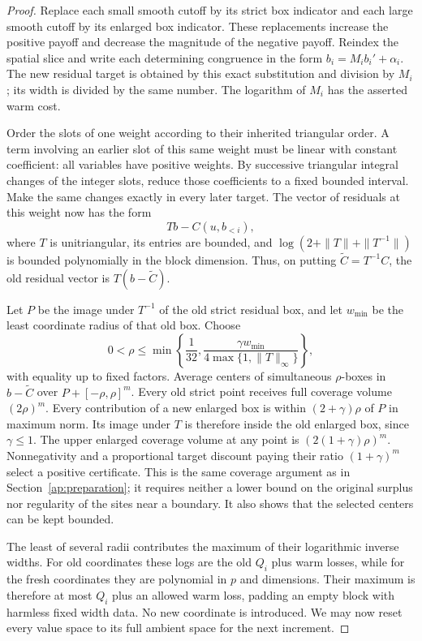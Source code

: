 \begin{proof}
Replace each small smooth cutoff by its strict box indicator and each large
smooth cutoff by its enlarged box indicator.  These replacements increase
the positive payoff and decrease the magnitude of the negative payoff.
Reindex the spatial slice and write each determining congruence in the form
$b_i=M_i b_i'+\alpha_i$.  The new residual target is obtained by this exact
substitution and division by $M_i$; its width is divided by the same number.
The logarithm of $M_i$ has the asserted warm cost.

Order the slots of one weight according to their inherited triangular order.
A term involving an earlier slot of this same weight must be linear with
constant coefficient: all variables have positive weights.  By successive
triangular integral changes of the integer slots, reduce those coefficients
to a fixed bounded interval.  Make the same changes exactly in every later
target.  The vector of residuals at this weight now has the form
\[
                    T b-C(u,b_{<i}),
\]
where $T$ is unitriangular, its entries are bounded, and
$\log(2+\|T\|+\|T^{-1}\|)$ is bounded polynomially in the block dimension.
Thus, on putting $\widetilde C=T^{-1}C$, the old residual vector is
$T(b-\widetilde C)$.

Let $P$ be the image under $T^{-1}$ of the old strict residual box, and let
$w_{\min}$ be the least coordinate radius of that old box.  Choose
\[
 0<\rho\le
 \min\left\{\frac1{32},
       \frac{\gamma w_{\min}}{4\max\{1,\|T\|_\infty\}}\right\},
\]
with equality up to fixed factors.  Average centers of simultaneous
$\rho$-boxes in $b-\widetilde C$ over $P+[-\rho,\rho]^m$.
Every old strict point receives full coverage volume $(2\rho)^m$.
Every contribution of a new enlarged box is within
$(2+\gamma)\rho$ of $P$ in maximum norm.  Its image under $T$ is therefore
inside the old enlarged box, since $\gamma\le1$.
The upper enlarged coverage volume at any point is
$(2(1+\gamma)\rho)^m$.  Nonnegativity and a proportional target
discount paying their ratio $(1+\gamma)^m$ select a positive certificate.
This is the same coverage
argument as in Section~\ref{ap:preparation}; it requires neither a lower
bound on the original surplus nor regularity of the sites near a boundary.
It also shows that the selected centers can be kept bounded.

The least of several radii contributes the maximum of their logarithmic
inverse widths.  For old coordinates these logs are the old $Q_i$ plus
warm losses, while for the fresh coordinates they are polynomial in $p$
and dimensions.  Their maximum is therefore at most $Q_i$ plus an allowed
warm loss, padding an empty block with harmless fixed width data.  No new
coordinate is introduced.  We may now reset every value space to its full
ambient space for the next increment.
\end{proof}

